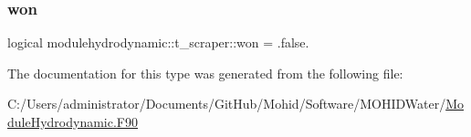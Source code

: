 \mbox{\label{structmodulehydrodynamic_1_1t__scraper_aa5762cce7c1f06eb2e71a8b1725af272}} 
\subsubsection{\texorpdfstring{won}{won}}
{\footnotesize\ttfamily logical modulehydrodynamic\+::t\+\_\+scraper\+::won = .false.\hspace{0.3cm}{\ttfamily [private]}}



The documentation for this type was generated from the following file\+:\begin{DoxyCompactItemize}
\item 
C\+:/\+Users/administrator/\+Documents/\+Git\+Hub/\+Mohid/\+Software/\+M\+O\+H\+I\+D\+Water/\mbox{\hyperlink{_module_hydrodynamic_8_f90}{Module\+Hydrodynamic.\+F90}}\end{DoxyCompactItemize}
